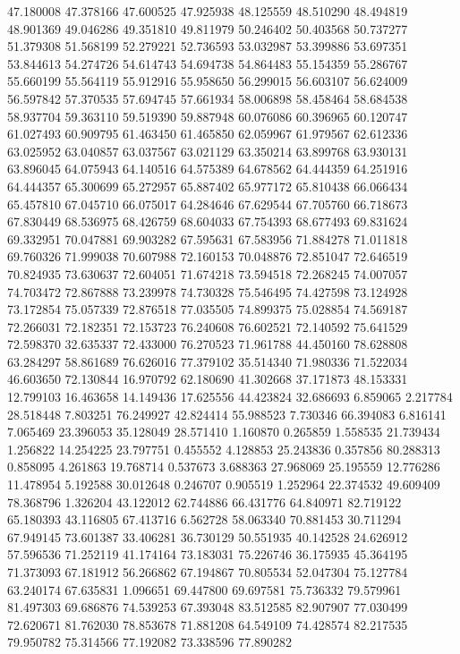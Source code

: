 47.180008
47.378166
47.600525
47.925938
48.125559
48.510290
48.494819
48.901369
49.046286
49.351810
49.811979
50.246402
50.403568
50.737277
51.379308
51.568199
52.279221
52.736593
53.032987
53.399886
53.697351
53.844613
54.274726
54.614743
54.694738
54.864483
55.154359
55.286767
55.660199
55.564119
55.912916
55.958650
56.299015
56.603107
56.624009
56.597842
57.370535
57.694745
57.661934
58.006898
58.458464
58.684538
58.937704
59.363110
59.519390
59.887948
60.076086
60.396965
60.120747
61.027493
60.909795
61.463450
61.465850
62.059967
61.979567
62.612336
63.025952
63.040857
63.037567
63.021129
63.350214
63.899768
63.930131
63.896045
64.075943
64.140516
64.575389
64.678562
64.444359
64.251916
64.444357
65.300699
65.272957
65.887402
65.977172
65.810438
66.066434
65.457810
67.045710
66.075017
64.284646
67.629544
67.705760
66.718673
67.830449
68.536975
68.426759
68.604033
67.754393
68.677493
69.831624
69.332951
70.047881
69.903282
67.595631
67.583956
71.884278
71.011818
69.760326
71.999038
70.607988
72.160153
70.048876
72.851047
72.646519
70.824935
73.630637
72.604051
71.674218
73.594518
72.268245
74.007057
74.703472
72.867888
73.239978
74.730328
75.546495
74.427598
73.124928
73.172854
75.057339
72.876518
77.035505
74.899375
75.028854
74.569187
72.266031
72.182351
72.153723
76.240608
76.602521
72.140592
75.641529
72.598370
32.635337
72.433000
76.270523
71.961788
44.450160
78.628808
63.284297
58.861689
76.626016
77.379102
35.514340
71.980336
71.522034
46.603650
72.130844
16.970792
62.180690
41.302668
37.171873
48.153331
12.799103
16.463658
14.149436
17.625556
44.423824
32.686693
6.859065
2.217784
28.518448
7.803251
76.249927
42.824414
55.988523
7.730346
66.394083
6.816141
7.065469
23.396053
35.128049
28.571410
1.160870
0.265859
1.558535
21.739434
1.256822
14.254225
23.797751
0.455552
4.128853
25.243836
0.357856
80.288313
0.858095
4.261863
19.768714
0.537673
3.688363
27.968069
25.195559
12.776286
11.478954
5.192588
30.012648
0.246707
0.905519
1.252964
22.374532
49.609409
78.368796
1.326204
43.122012
62.744886
66.431776
64.840971
82.719122
65.180393
43.116805
67.413716
6.562728
58.063340
70.881453
30.711294
67.949145
73.601387
33.406281
36.730129
50.551935
40.142528
24.626912
57.596536
71.252119
41.174164
73.183031
75.226746
36.175935
45.364195
71.373093
67.181912
56.266862
67.194867
70.805534
52.047304
75.127784
63.240174
67.635831
1.096651
69.447800
69.697581
75.736332
79.579961
81.497303
69.686876
74.539253
67.393048
83.512585
82.907907
77.030499
72.620671
81.762030
78.853678
71.881208
64.549109
74.428574
82.217535
79.950782
75.314566
77.192082
73.338596
77.890282
